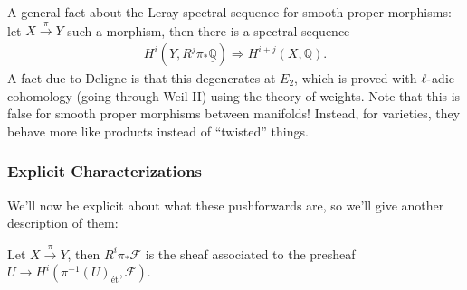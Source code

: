 \begin{remark}

A general fact about the Leray spectral sequence for smooth proper
morphisms: let \(X \xrightarrow{\pi} Y\) such a morphism, then there is
a spectral sequence
\begin{align*}  
H^i(Y, R^j \pi_* \underline{{\mathbb{Q}}}) \Rightarrow H^{i+j}(X, {\mathbb{Q}})
.\end{align*}
A fact due to Deligne is that this degenerates at \(E_2\), which is
proved with \(\ell{\hbox{-}}\)adic cohomology (going through Weil II)
using the theory of weights. Note that this is false for smooth proper
morphisms between manifolds! Instead, for varieties, they behave more
like products instead of ``twisted'' things.

\end{remark}

\hypertarget{explicit-characterizations}{%
\subsubsection{Explicit
Characterizations}\label{explicit-characterizations}}

We'll now be explicit about what these pushforwards are, so we'll give
another description of them:

\begin{proposition}[?]

Let \(X \xrightarrow{\pi} Y\), then \(R^i \pi_* \mathcal{F}\) is the
sheaf associated to the presheaf
\(U\to H^i(\pi^{-1}(U)_\text{ét}, \mathcal{F})\).

\end{proposition}

